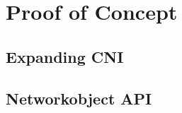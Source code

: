 \chapter{Proof of Concept}
\label{chap:proof-of-concept}
\section{Expanding CNI}
\label{sec:expanding-cni}

\section{Networkobject API}
\label{sec:networkobject-api}
